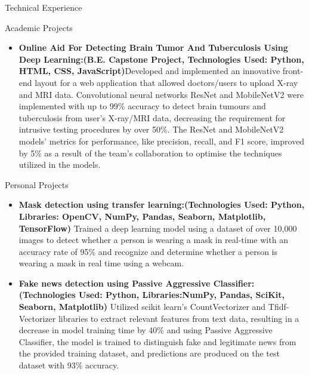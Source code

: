 \documentclass[]{mcdowellcv}
\begin{document}
\begin{cvsection}{Technical Experience}
\begin{cvsubsection}{Academic Projects}{}{}
\begin{itemize}
				\item  \textbf{Online Aid For Detecting Brain Tumor And Tuberculosis Using Deep Learning:\newline(B.E. Capstone Project, Technologies Used: Python, HTML, CSS, JavaScript)}\newline Developed and implemented an innovative front-end layout for a web application that allowed doctors/users to upload X-ray and MRI data. Convolutional neural networks ResNet and MobileNetV2 were implemented with up to 99\% accuracy to detect brain tumours and tuberculosis from user's X-ray/MRI data, decreasing the requirement for intrusive testing procedures by over 50\%. The ResNet and MobileNetV2 models' metrics for performance, like precision, recall, and F1 score, improved by 5\% as a result of the team's collaboration to optimise the techniques utilized in the models.
			\end{itemize}
		\end{cvsubsection}
		\begin{cvsubsection}{Personal Projects}{}{}
			\begin{itemize}
				\item  \textbf{Mask detection using transfer learning:\newline (Technologies Used: Python, Libraries: OpenCV, NumPy, Pandas, Seaborn, Matplotlib, TensorFlow)} \newline Trained a deep learning model using a dataset of over 10,000 images to detect whether a person is wearing a mask in real-time with an accuracy rate of 95\% and recognize and determine whether a person is wearing a mask in real time using a webcam.
                \item  \textbf{Fake news detection using Passive Aggressive Classifier:\newline(Technologies Used: Python, Libraries:NumPy, Pandas, SciKit, Seaborn, Matplotlib)} \newline Utilized scikit learn's CountVectorizer and Tfidf-Vectorizer libraries to extract relevant features from text data, resulting in a decrease in model training time by 40\% and using Passive Aggressive Classifier, the model is trained to distinguish fake and legitimate news from the provided training dataset, and predictions are produced on the test dataset with 93\% accuracy.
			\end{itemize}
		\end{cvsubsection}
	\end{cvsection}
	
\end{document}
